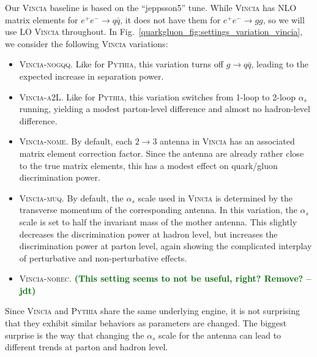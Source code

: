 \documentclass[11pt]{cernrep}
\newcommand{\jdt}[1]{\textbf{\textcolor{darkgreen}{(#1 --jdt)}}}
\begin{document}
Our \textsc{Vincia} baseline is based on the ``jeppsson5'' tune.  While \textsc{Vincia} has NLO matrix elements for $e^+ e^- \to q \bar{q}$, it does not have them for $e^+ e^- \to gg$, so we will use LO \textsc{Vincia} throughout.  In Fig.~\ref{quarkgluon_fig:settings_variation_vincia}, we consider the following \textsc{Vincia} variations:
\begin{itemize}
\item \textsc{Vincia-nogqq}.  Like for \textsc{Pythia}, this variation turns off $g \to q \bar{q}$, leading to the expected increase in separation power.
\item \textsc{Vincia-a2L}.  Like for \textsc{Pythia}, this variation switches from 1-loop to 2-loop $\alpha_s$ running, yielding a modest parton-level difference and almost no hadron-level difference. 
\item \textsc{Vincia-nome}.  By default, each $2 \to 3$ antenna in \textsc{Vincia} has an associated matrix element correction factor.  Since the antenna are already rather close to the true matrix elements, this has a modest effect on quark/gluon discrimination power.
\item \textsc{Vincia-muq}.  By default, the $\alpha_s$ scale used in \textsc{Vincia} is determined by the transverse momentum of the corresponding antenna.  In this variation, the $\alpha_s$ scale is set to half the invariant mass of the mother antenna.  This slightly decreases the discrimination power at hadron level, but increases the discrimination power at parton level, again showing the complicated interplay of perturbative and non-perturbative effects.
\item \textsc{Vincia-norec}.   \jdt{This setting seems to not be useful, right? Remove?}
\end{itemize}
Since \textsc{Vincia} and \textsc{Pythia} share the same underlying engine, it is not surprising that they exhibit similar behaviors as parameters are changed.  The biggest surprise is the way that changing the $\alpha_s$ scale for the antenna can lead to different trends at parton and hadron level.
\end{document}
